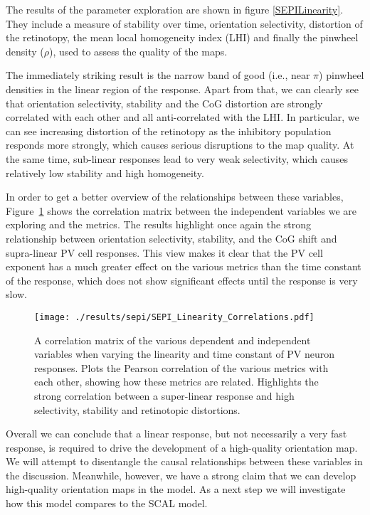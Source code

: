 The results of the parameter exploration are shown in figure
\ref{SEPILinearity}. They include a measure of stability over time,
orientation selectivity, distortion of the retinotopy, the mean local
homogeneity index (LHI) and finally the pinwheel density ($\rho$),
used to assess the quality of the maps.

The immediately striking result is the narrow band of good (i.e., near
$\pi$) pinwheel densities in the linear region of the response. Apart
from that, we can clearly see that orientation selectivity, stability
and the CoG distortion are strongly correlated with each other and all
anti-correlated with the LHI. In particular, we can see increasing
distortion of the retinotopy as the inhibitory population responds
more strongly, which causes serious disruptions to the map quality. At
the same time, sub-linear responses lead to very weak selectivity,
which causes relatively low stability and high homogeneity.

In order to get a better overview of the relationships between these
variables, Figure~\ref{SEPILinearityCorr} shows the correlation matrix
between the independent variables we are exploring and the
metrics. The results highlight once again the strong relationship
between orientation selectivity, stability, and the CoG shift and
supra-linear PV cell responses. This view makes it clear that the PV
cell exponent has a much greater effect on the various metrics than
the time constant of the response, which does not show significant
effects until the response is very slow.

\begin{figure}
	\centering
    \texttt{[image: ./results/sepi/SEPI\_Linearity\_Correlations.pdf]}
	\caption{A correlation matrix of the various dependent and
      independent variables when varying the linearity and time
      constant of PV neuron responses. Plots the Pearson correlation
      of the various metrics with each other, showing how these
      metrics are related. Highlights the strong correlation between a
      super-linear response and high selectivity, stability and
      retinotopic distortions.}
	\label{SEPILinearityCorr}
\end{figure}

Overall we can conclude that a linear response, but not necessarily a
very fast response, is required to drive the development of a
high-quality orientation map. We will attempt to disentangle the
causal relationships between these variables in the
discussion. Meanwhile, however, we have a strong claim that we can develop
high-quality orientation maps in the model. As a next step we will
investigate how this model compares to the SCAL model.

